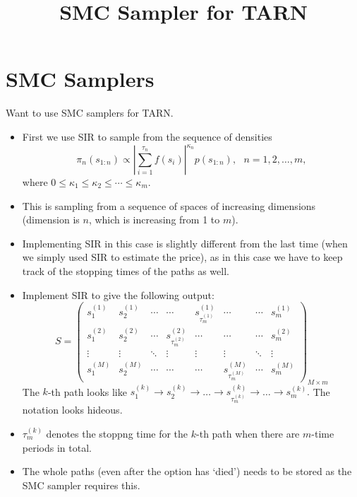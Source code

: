\documentclass{article}
\begin{document}
\title{SMC Sampler for TARN}
\maketitle

\section{SMC Samplers}

Want to use SMC samplers for TARN. 

\begin{itemize}

\item First we use SIR to sample from the sequence of densities 
$$ \pi_{n}(s_{1:n}) \propto \left | \sum_{i=1}^{\tau_{n}} f(s_{i}) \right |^{\kappa_{n}} p(s_{1:n}), \text{ } n = 1, 2, \ldots, m, $$
where $ 0 \leq \kappa_{1} \leq \kappa_{2} \leq \cdots \leq \kappa_{m} $.

\item This is sampling from a sequence of spaces of increasing dimensions (dimension is $n$, which is increasing from 1 to $m$).

\item Implementing SIR in this case is slightly different from the last time (when we simply used SIR to estimate the price), as in this case we have to keep track of the stopping times of the paths as well. 

\item Implement SIR to give the following output:
$$ S =
 \begin{pmatrix}
  s_{1}^{(1)} & s_{2}^{(1)} & \cdots & \cdots & s_{\tau_{m}^{(1)}}^{(1)} & \cdots & \cdots & s_{m}^{(1)} \\
  s_{1}^{(2)} & s_{2}^{(2)} & \cdots & s_{\tau_{m}^{(2)}}^{(2)} & \cdots & \cdots & \cdots & s_{m}^{(2)} \\
  \vdots  & \vdots  & \ddots & \vdots & \vdots  & \vdots  & \ddots & \vdots \\
 s_{1}^{(M)} & s_{2}^{(M)} & \cdots & \cdots & \cdots & s_{\tau_{m}^{(M)}}^{(M)} & \cdots & s_{m}^{(M)} 
 \end{pmatrix}_{M \times m}
$$ 
The $k$-th path looks like $ s_{1}^{(k)} \rightarrow s_{2}^{(k)} \rightarrow \ldots \rightarrow s_{\tau_{m}^{(k)}}^{(k)} \rightarrow \ldots \rightarrow s_{m}^{(k)}. $ The notation looks hideous. 

\item $\tau_{m}^{(k)}$ denotes the stoppng time for the $k$-th path when there are $m$-time periods in total. 

\item The whole paths (even after the option has `died') needs to be stored as the SMC sampler requires this.

\end{itemize}
\end{document}
